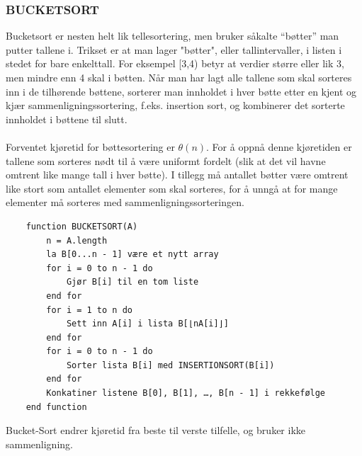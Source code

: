 \subsubsection{BUCKETSORT}
Bucketsort er nesten helt lik tellesortering, men bruker såkalte “bøtter” man putter tallene i. Trikset er at man lager "bøtter", eller tallintervaller, i listen i stedet for bare enkelttall. For eksempel [3,4) betyr at verdier større eller lik 3, men mindre enn 4 skal i bøtten. Når man har lagt alle tallene som skal sorteres inn i de tilhørende bøttene, sorterer man innholdet i hver bøtte etter en kjent og kjær sammenligningssortering, f.eks. insertion sort, og kombinerer det sorterte innholdet i bøttene til slutt.
\\\\
Forventet kjøretid for bøttesortering er $\theta(n)$. For å oppnå denne kjøretiden er tallene som sorteres nødt til å være uniformt fordelt (slik at det vil havne omtrent like mange tall i hver bøtte). I tillegg må antallet bøtter være omtrent like stort som antallet elementer som skal sorteres, for å unngå at for mange elementer må sorteres med sammenligningssorteringen.

\begin{lstlisting}
    function BUCKETSORT(A)
	    n = A.length
	    la B[0...n - 1] være et nytt array
	    for i = 0 to n - 1 do
	    	Gjør B[i] til en tom liste
	    end for
	    for i = 1 to n do
    		Sett inn A[i] i lista B[⌊nA[i]⌋]
    	end for
	    for i = 0 to n - 1 do
		    Sorter lista B[i] med INSERTIONSORT(B[i])
	    end for
	    Konkatiner listene B[0], B[1], …, B[n - 1] i rekkefølge
    end function
\end{lstlisting}

\noindent Bucket-Sort endrer kjøretid fra beste til verste tilfelle, og bruker ikke sammenligning.

